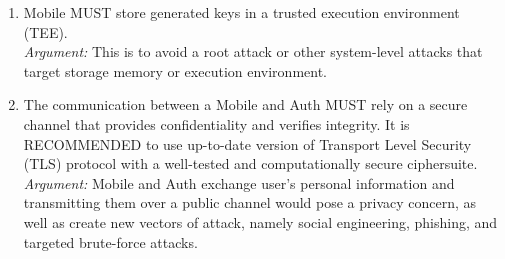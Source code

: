\begin{enumerate}
            \item Mobile MUST store generated keys in a trusted execution environment (TEE).\\        
            \textit{Argument:} This is to avoid a root attack or other system-level attacks that target storage 
                            memory or execution environment.

            \item The communication between a Mobile and Auth MUST rely on a secure channel that provides 
                confidentiality and verifies integrity. It is RECOMMENDED to use up-to-date version of 
                Transport Level Security (TLS) protocol with a well-tested and computationally secure 
                ciphersuite.\\      
            \textit{Argument:} Mobile and Auth exchange user's personal information and transmitting them over a 
                            public channel would pose a privacy concern, as well as create new vectors of attack, 
                            namely social engineering, phishing, and targeted brute-force attacks.
        \end{enumerate}